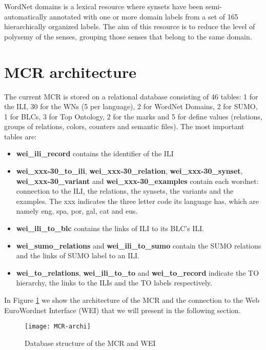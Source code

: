 \documentclass[runningheads]{llncs}
\begin{document}
WordNet domains is a lexical resource where synsets have been semi-automatically annotated with one or more domain labels from a set of 165 hierarchically organized labels. The aim of this resource is to  reduce  the  level  of  polysemy  of  the  senses, grouping those senses that belong to the same domain.

\section{MCR architecture} %

The current MCR is stored on a relational database consisting of 46 tables: 1 for the ILI, 30 for the WNs (5 per language), 2 for WordNet Domains, 2 for SUMO, 1 for BLCs, 3 for Top Ontology, 2 for the marks and 5 for define values  (relations,  groups  of  relations,  colors,  counters  and  semantic  files).  The most important tables are: 

\begin{itemize}
\item {\bf wei\_ili\_record} contains  the  identifier  of  the  ILI
\item {\bf wei\_xxx-30\_to\_ili}, {\bf wei\_xxx-30\_relation}, {\bf wei\_xxx-30\_synset}, {\bf wei\_xxx-30\_variant} and {\bf wei\_xxx-30\_examples} contain each  wordnet: connection to the ILI, the relations, the synsets, the variants and the examples. The xxx indicates the three letter code its language has, which are namely eng, spa, por, gal, cat and eus. 
\item {\bf  wei\_ili\_to\_blc}  contains the links of ILI to its BLC’s ILI.
\item {\bf wei\_sumo\_relations} and {\bf wei\_ili\_to\_sumo} contain the SUMO relations and the  links of SUMO label to an ILI.
\item {\bf  wei\_to\_relations}, {\bf  wei\_ili\_to\_to} and {\bf wei\_to\_record} indicate the TO hierarchy, the links to the ILIs  and the TO labels respectively.
\end{itemize}

In Figure \ref{fig:mcr-archi} we show the architecture of the MCR and the connection to the Web EuroWordnet Interface (WEI) that we will present in the following section.

\begin{figure}[h]
\begin{center}
\texttt{[image: MCR-archi]}
\end{center}
\caption{Database structure of the MCR and WEI}
\label{fig:mcr-archi}
\end{figure}
\end{document}
